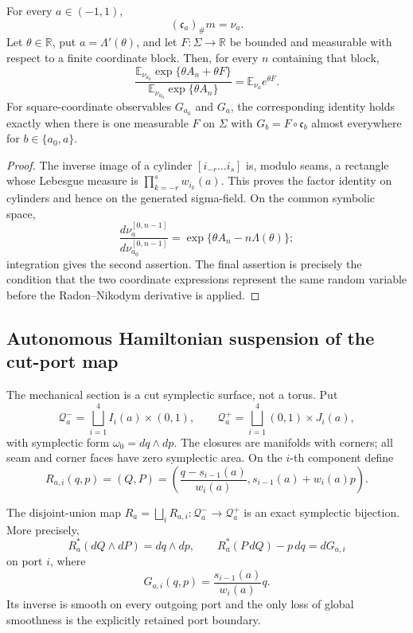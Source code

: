 \begin{theorem}
\label{thm:r3-a1-common}
For every \(a\in(-1,1)\),
\[
 (\mathfrak c_a)_\#m=\nu_a .
\]
Let \(\theta\in\mathbb R\), put \(a=\Lambda'(\theta)\), and let
\(F:\Sigma\to\mathbb R\) be bounded and measurable with respect to a finite
coordinate block.  Then, for every \(n\) containing that block,
\[
 \frac{\mathbb E_{\nu_{a_0}}
  \exp\{\theta A_n+\theta F\}}
 {\mathbb E_{\nu_{a_0}}\exp\{\theta A_n\}}
 =\mathbb E_{\nu_a}e^{\theta F}.
\]
For square-coordinate observables \(G_{a_0}\) and \(G_a\), the corresponding
identity holds exactly when there is one measurable \(F\) on \(\Sigma\) with
\(G_b=F\circ\mathfrak c_b\) almost everywhere for
\(b\in\{a_0,a\}\).
\end{theorem}

\begin{proof}
The inverse image of a cylinder
\([i_{-r}\ldots i_s]\) is, modulo seams, a rectangle whose Lebesgue measure is
\(\prod_{k=-r}^s w_{i_k}(a)\).  This proves the factor identity on cylinders
and hence on the generated sigma-field.  On the common symbolic space,
\[
 \frac{d\nu_a^{[0,n-1]}}{d\nu_{a_0}^{[0,n-1]}}
 =\exp\{\theta A_n-n\Lambda(\theta)\};
\]
integration gives the second assertion.  The final assertion is precisely the
condition that the two coordinate expressions represent the same random
variable before the Radon--Nikodym derivative is applied.
\end{proof}

\subsection{Autonomous Hamiltonian suspension of the cut-port map}

The mechanical section is a cut symplectic surface, not a torus.  Put
\[
 \mathcal Q_a^-
 =\bigsqcup_{i=1}^4 I_i(a)\times(0,1),
 \qquad
 \mathcal Q_a^+
 =\bigsqcup_{i=1}^4(0,1)\times J_i(a),
\]
with symplectic form \(\omega_0=dq\wedge dp\).  The closures are manifolds
with corners; all seam and corner faces have zero symplectic area.  On the
\(i\)-th component define
\[
 R_{a,i}(q,p)=
 \left(Q,P\right)
 =\left(
 \frac{q-s_{i-1}(a)}{w_i(a)},
 s_{i-1}(a)+w_i(a)p
 \right).
\]

\begin{lemma}
\label{lem:r4-a1-exact-port}
The disjoint-union map
\(R_a=\bigsqcup_iR_{a,i}:\mathcal Q_a^-\to\mathcal Q_a^+\) is an exact
symplectic bijection.  More precisely,
\[
 R_a^*(dQ\wedge dP)=dq\wedge dp,
\qquad
 R_a^*(P\,dQ)-p\,dq=dG_{a,i}
\]
on port \(i\), where
\[
 G_{a,i}(q,p)=\frac{s_{i-1}(a)}{w_i(a)}q.
\]
Its inverse is smooth on every outgoing port and the only loss of global
smoothness is the explicitly retained port boundary.
\end{lemma}

